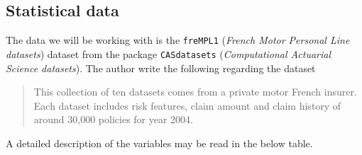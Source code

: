 \documentclass[
]{article}
\begin{document}
\hypertarget{statistical-data}{%
\subsection{Statistical data}\label{statistical-data}}

The data we will be working with is the \texttt{freMPL1} (\emph{French
Motor Personal Line datasets}) dataset from the package
\texttt{CASdatasets} (\emph{Computational Actuarial Science datasets}).
The author write the following regarding the dataset

\begin{quote}
This collection of ten datasets comes from a private motor French
insurer. Each dataset includes risk features, claim amount and claim
history of around 30,000 policies for year 2004.
\end{quote}

A detailed description of the variables may be read in the below table.
\end{document}
